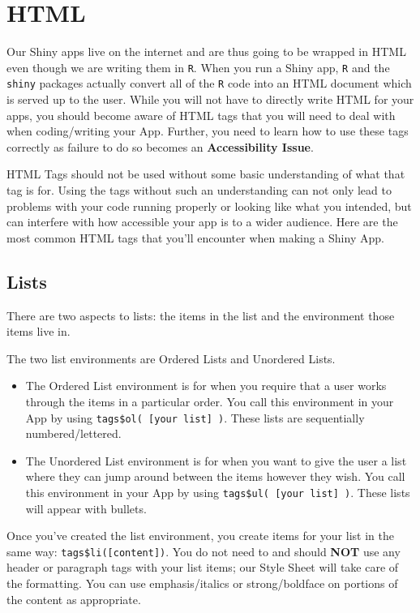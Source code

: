 \documentclass[
]{book}
\providecommand{\tightlist}{%
  \setlength{\itemsep}{0pt}\setlength{\parskip}{0pt}}
\begin{document}
\hypertarget{htmlb}{%
\section{HTML}\label{htmlb}}

Our Shiny apps live on the internet and are thus going to be wrapped in HTML even though we are writing them in \texttt{R}. When you run a Shiny app, \texttt{R} and the \texttt{shiny} packages actually convert all of the \texttt{R} code into an HTML document which is served up to the user. While you will not have to directly write HTML for your apps, you should become aware of HTML tags that you will need to deal with when coding/writing your App. Further, you need to learn how to use these tags correctly as failure to do so becomes an \textbf{Accessibility Issue}.

HTML Tags should not be used without some basic understanding of what that tag is for. Using the tags without such an understanding can not only lead to problems with your code running properly or looking like what you intended, but can interfere with how accessible your app is to a wider audience. Here are the most common HTML tags that you'll encounter when making a Shiny App.

\hypertarget{lists-1}{%
\subsection{Lists}\label{lists-1}}

There are two aspects to lists: the items in the list and the environment those items live in.

The two list environments are Ordered Lists and Unordered Lists.

\begin{itemize}
\tightlist
\item
  The Ordered List environment is for when you require that a user works through the items in a particular order. You call this environment in your App by using \texttt{tags\$ol(\ {[}your\ list{]}\ )}. These lists are sequentially numbered/lettered.
\item
  The Unordered List environment is for when you want to give the user a list where they can jump around between the items however they wish. You call this environment in your App by using \texttt{tags\$ul(\ {[}your\ list{]}\ )}. These lists will appear with bullets.
\end{itemize}

Once you've created the list environment, you create items for your list in the same way: \texttt{tags\$li({[}content{]})}. You do not need to and should \textbf{NOT} use any header or paragraph tags with your list items; our Style Sheet will take care of the formatting. You can use emphasis/italics or strong/boldface on portions of the content as appropriate.
\end{document}
